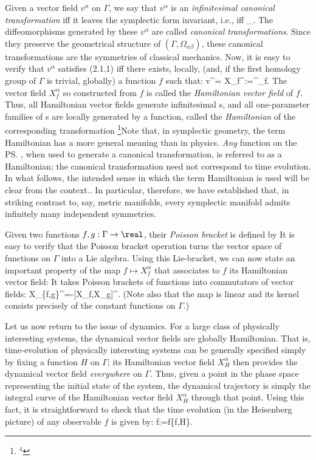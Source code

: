 Given a vector field $v^\alpha$ on $\Gamma$, we say that $v^\alpha$ is an {\it
infinitesimal canonical transformation} iff it leaves the symplectic form
invariant, i.e., iff
\bneq
{}\Omega_.
The diffeomorphisms generated by these $v^\alpha$ are called {\it canonical
transformations}. Since they preserve the geometrical structure of $(\Gamma,
\Omega_{\alpha\beta})$, these canonical  transformations are the symmetries
of classical mechanics. Now, it is easy to verify that $v^\alpha$ satisfies
(2.1.1) iff there exists, locally, (and, if the first homology group of
$\Gamma$ is trivial, globally) a function $f$ such that:
\bneq
v^\alpha = X_f^\alpha:=\Omega^\ab\nab_\beta f.
The vector field $X_f^\alpha$ so constructed from $f$ is called the {\it
Hamiltonian vector field} of $f$. Thus, all Hamiltonian vector fields generate
infinitesimal \ct s, and all one-parameter families of \ct s are locally
generated by a function, called the {\it Hamiltonian} of the corresponding
transformation%
\footnote{$^4$}{Note that, in symplectic geometry, the term Hamiltonian
has a more general meaning than in physics. {\it Any} function on the
\ps, when used to generate a canonical transformation, is referred to as
a Hamiltonian; the canonical transformation need not correspond to time
evolution. In what follows, the intended sense in which the term
Hamiltonian is used will be clear from the context.}.
In particular, therefore, we have established that, in striking contrast
to, say, metric manifolds, every symplectic manifold admits infinitely many
independent symmetries.

Given two functions $f,g:\Gamma\to\real$, their {\it Poisson bracket} is
defined by
It is easy to verify that the Poisson bracket operation turns the vector
space of functions on $\Gamma$ into a Lie algebra. Using this Lie-bracket,
we can now state an important property of the map $f\mapsto X_f^\alpha$
that associates to $f$ its Hamiltonian vector field: It takes Poisson
brackets of functions into commutators of vector fields:
\bneq
X_{\{f,g\}}^\alpha=-[X_f,X_g]^\alpha.
(Note also that the map is linear and its kernel consists precisely of the
constant functions on $\Gamma$.)

Let us now return to the issue of dynamics. For a large class of physically
interesting systems, the dynamical vector fields are globally Hamiltonian.
That is, time-evolution of physically interesting systems can be generally
specified simply by fixing a function $H$ on $\Gamma$; its Hamiltonian vector
field $X_H^\alpha$ then provides the dynamical vector field {\it everywhere}
on $\Gamma$. Thus, given a point in the phase space representing the initial
state of the system, the dynamical trajectory is simply the integral curve of
the Hamiltonian vector field $X_H^\alpha$ through that point. Using this fact,
it is straightforward to check that the time evolution (in the Heisenberg
picture) of any observable $f$ is given by:
\bneq
\dot f:=f\equiv\{f,H\}.

